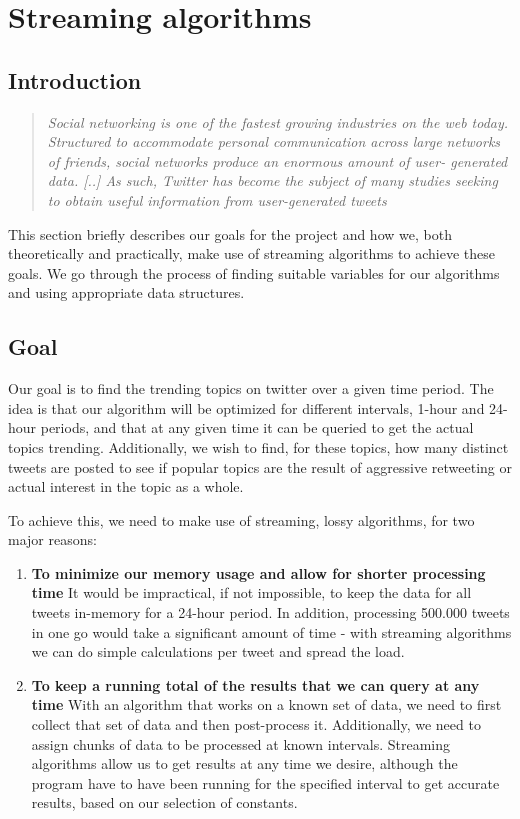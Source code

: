 \section{Streaming algorithms}\label{related work}
\subsection{Introduction}\label{algo-intro}

\begin{quote}\textit{
Social networking is one of the fastest growing industries on the web today. Structured to accommodate personal communication across large networks of friends, social networks produce an enormous amount of user- generated data. [..] As such, Twitter has become the subject of many studies seeking to obtain useful information from user-generated tweets \cite{genderprediction}  
}
\end{quote}

This section briefly describes our goals for the project and how we, both theoretically and practically, make use of streaming algorithms to achieve these goals. We go through the process of finding suitable variables for our algorithms and using appropriate data structures.

\subsection{Goal}\label{algo-goals}
Our goal is to find the trending topics on twitter over a given time period. The idea is that our algorithm will be optimized for different intervals, 1-hour and 24-hour periods, and that at any given time it can be queried to get the actual topics trending. Additionally, we wish to find, for these topics, how many distinct tweets are posted to see if popular topics are the result of aggressive retweeting or actual interest in the topic as a whole.

To achieve this, we need to make use of streaming, lossy algorithms, for two major reasons:
\begin{enumerate}
    \item \textbf{To minimize our memory usage and allow for shorter processing time}
        It would be impractical, if not impossible, to keep the data for all tweets in-memory for a 24-hour period. In addition, processing 500.000 tweets in one go would take a significant amount of time - with streaming algorithms we can do simple calculations per tweet and spread the load.

    \item \textbf{To keep a running total of the results that we can query at any time}
        With an algorithm that works on a known set of data, we need to first collect that set of data and then post-process it. Additionally, we need to assign chunks of data to be processed at known intervals. Streaming algorithms allow us to get results at any time we desire, although the program have to have been running for the specified interval to get accurate results, based on our selection of constants.
\end{enumerate}

